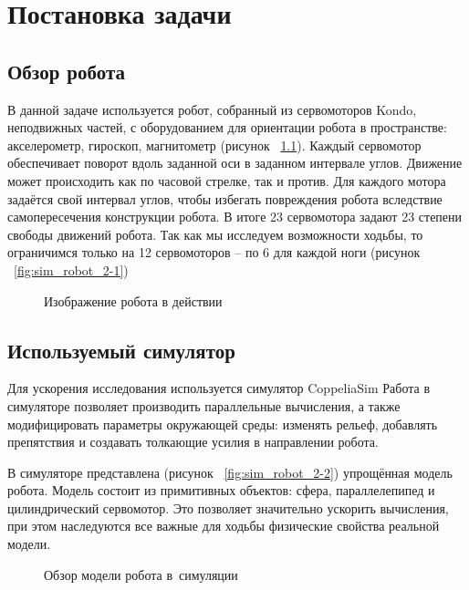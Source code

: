 \chapter{Постановка задачи}\label{ch:ch1}
\section{Обзор робота}\label{sec:ch1/sec1}
В данной задаче используется робот, собранный из сервомоторов Kondo,  неподвижных частей, с оборудованием для ориентации робота в пространстве: акселерометр, гироскоп, магнитометр (рисунок ~\cref{fig:real_robot}). Каждый сервомотор обеспечивает поворот вдоль заданной оси в заданном интервале углов. Движение может происходить как по часовой стрелке, так и против. Для каждого мотора задаётся свой интервал углов, чтобы избегать повреждения робота вследствие самопересечения конструкции робота. В итоге 23 сервомотора задают 23 степени свободы движений робота. Так как мы исследуем возможности ходьбы, то ограничимся только на 12 сервомоторов – по 6 для каждой ноги (рисунок ~\cref{fig:sim_robot_2-1})

\begin{figure}[ht]
    \caption[Изображение робота в действии]{Изображение робота в действии}\label{fig:real_robot}
\end{figure}
\section{Используемый симулятор}\label{sec:ch1/sec1}

Для ускорения исследования используется симулятор CoppeliaSim \cite{coppeliaSim} Работа в симуляторе позволяет производить параллельные вычисления, а также модифицировать параметры окружающей среды: изменять рельеф, добавлять препятствия и создавать толкающие усилия в направлении робота. 

В симуляторе представлена (рисунок ~\cref{fig:sim_robot_2-2}) упрощённая модель робота. Модель состоит из примитивных объектов: сфера, параллелепипед и цилиндрический сервомотор. Это позволяет значительно ускорить вычисления, при этом наследуются все важные для ходьбы физические свойства реальной модели.

\begin{figure}[ht]
    \caption[Обзор модели робота в~симуляции]{Обзор модели робота в~симуляции}\label{fig:sim_robot_2}
\end{figure}

